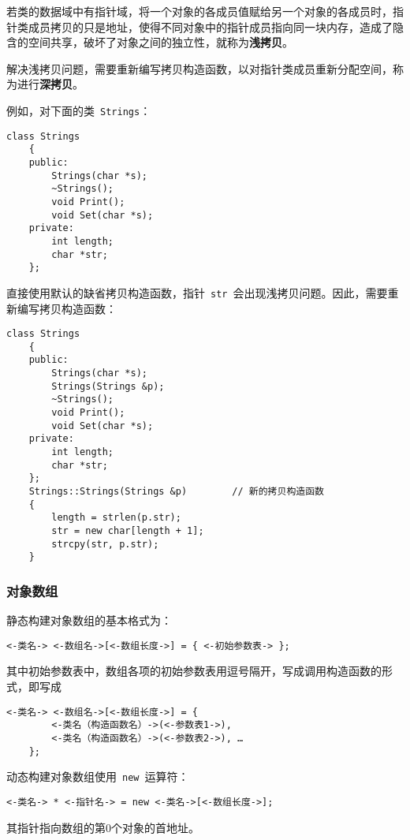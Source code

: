 \documentclass[10pt, a4paper, oneside, fontset=none]{ctexart}
\theoremstyle{plain}
\theoremstyle{definition}
\newcommand{\colors}[1]{\color{#1!75!black}}
\newcommand{\tboba}[1]{\textbf{\kai\color{bali!75!black}#1}}
\begin{document}
若类的数据域中有指针域，将一个对象的各成员值赋给另一个对象的各成员时，指针类成员拷贝的只是地址，使得不同对象中的指针成员指向同一块内存，造成了隐含的空间共享，破坏了对象之间的独立性，就称为\tboba{浅拷贝}。

解决浅拷贝问题，需要重新编写拷贝构造函数，以对指针类成员重新分配空间，称为进行\tboba{深拷贝}。

例如，对下面的类~\lstinline[moreemph={Strings}, emphstyle=\colors{qinglv}, moreemph={[2]{length, str, s}}, emphstyle={[2]\it\ttfamily}, ]|Strings|：
\begin{lstlisting}[moreemph={Strings}, emphstyle=\colors{qinglv}, moreemph={[2]{length, str, s}}, emphstyle={[2]\it\ttfamily}, ]
	class Strings
	{
	public:
		Strings(char *s);
		~Strings();
		void Print();
		void Set(char *s);
	private:
		int length;
		char *str;
	};
\end{lstlisting}

\noindent 直接使用默认的缺省拷贝构造函数，指针~\lstinline[moreemph={Strings}, emphstyle=\colors{qinglv}, moreemph={[2]{length, str, s}}, emphstyle={[2]\it\ttfamily}, ]|str|~会出现浅拷贝问题。因此，需要重新编写拷贝构造函数：
\begin{lstlisting}[moreemph={Strings}, emphstyle=\colors{qinglv}, moreemph={[2]{length, str, s, p}}, emphstyle={[2]\it\ttfamily}, ]
	class Strings
	{
	public:
		Strings(char *s);
		Strings(Strings &p);
		~Strings();
		void Print();
		void Set(char *s);
	private:
		int length;
		char *str;
	};
	Strings::Strings(Strings &p)		// 新的拷贝构造函数
	{
		length = strlen(p.str);
		str = new char[length + 1];
		strcpy(str, p.str);
	}
\end{lstlisting}

\subsubsection{对象数组}
静态构建对象数组的基本格式为：
\begin{lstlisting}[style=intro]
	<-类名-> <-数组名->[<-数组长度->] = { <-初始参数表-> };
\end{lstlisting}
其中初始参数表中，数组各项的初始参数表用逗号隔开，写成调用构造函数的形式，即写成
\begin{lstlisting}[style=intro]
	<-类名-> <-数组名->[<-数组长度->] = {
		<-类名（构造函数名）->(<-参数表1->), 
		<-类名（构造函数名）->(<-参数表2->), … 
	};
\end{lstlisting}

动态构建对象数组使用~\lstinline|new|~运算符：
\begin{lstlisting}[style=intro]
	<-类名-> * <-指针名-> = new <-类名->[<-数组长度->];
\end{lstlisting}
其指针指向数组的第0个对象的首地址。
\end{document}
